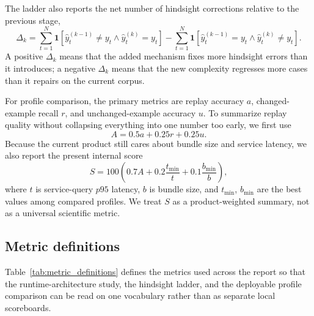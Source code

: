 \documentclass{article}
\begin{document}
The ladder also reports the net number of hindsight corrections relative to the previous stage,
\[
\Delta_k =
\sum_{t=1}^{N}\mathbf{1}\!\left[\hat y_t^{(k-1)} \neq y_t \land \hat y_t^{(k)} = y_t\right]
-
\sum_{t=1}^{N}\mathbf{1}\!\left[\hat y_t^{(k-1)} = y_t \land \hat y_t^{(k)} \neq y_t\right].
\]
A positive \(\Delta_k\) means that the added mechanism fixes more hindsight errors than it introduces; a negative \(\Delta_k\) means that the new complexity regresses more cases than it repairs on the current corpus.

For profile comparison, the primary metrics are replay accuracy \(a\), changed-example recall \(r\), and unchanged-example accuracy \(u\). To summarize replay quality without collapsing everything into one number too early, we first use
\[
A = 0.5a + 0.25r + 0.25u.
\]
Because the current product still cares about bundle size and service latency, we also report the present internal score
\[
S = 100 \left(0.7A + 0.2\frac{t_{\min}}{t} + 0.1\frac{b_{\min}}{b}\right),
\]
where \(t\) is service-query \(p95\) latency, \(b\) is bundle size, and \(t_{\min}\), \(b_{\min}\) are the best values among compared profiles. We treat \(S\) as a product-weighted summary, not as a universal scientific metric.

\subsection{Metric definitions}
Table~\ref{tab:metric_definitions} defines the metrics used across the report so that the runtime-architecture study, the hindsight ladder, and the deployable profile comparison can be read on one vocabulary rather than as separate local scoreboards.
\end{document}

